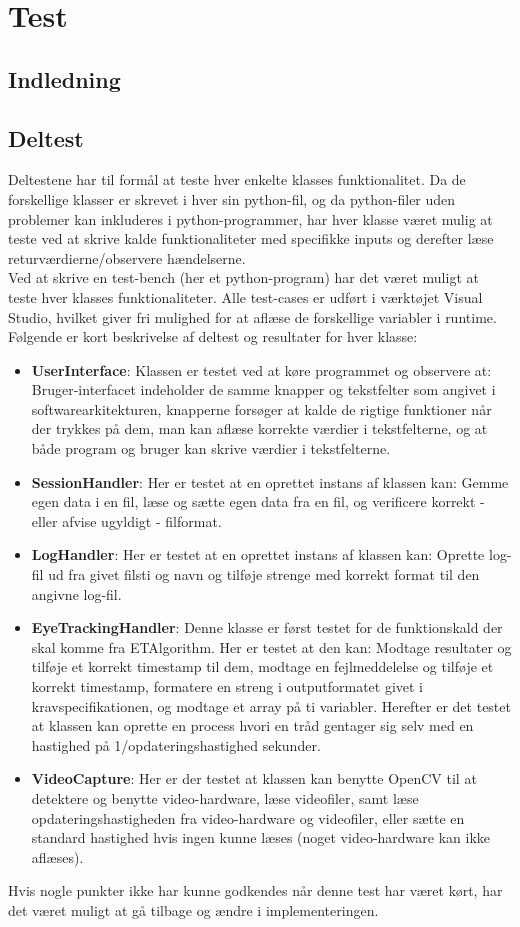 \documentclass[rapport.tex]{subfiles}
\begin{document}
\section{Test}
	\subsection{Indledning}
	\subsection{Deltest}
	Deltestene har til formål at teste hver enkelte klasses funktionalitet. 
	Da de forskellige klasser er skrevet i hver sin python-fil, og da python-filer uden problemer kan inkluderes i python-programmer, har hver klasse været mulig at teste ved at skrive kalde funktionaliteter med specifikke inputs og derefter læse returværdierne/observere hændelserne. \\
	
	Ved at skrive en test-bench (her et python-program) har det været muligt at teste hver klasses funktionaliteter. Alle test-cases er udført i værktøjet Visual Studio, hvilket giver fri mulighed for at aflæse de forskellige variabler i runtime. Følgende er kort beskrivelse af deltest og resultater for hver klasse:
	\begin{itemize}
		\item \textbf{UserInterface}: Klassen er testet ved at køre programmet og observere at: Bruger-interfacet indeholder de samme knapper og tekstfelter som angivet i softwarearkitekturen, knapperne forsøger at kalde de rigtige funktioner når der trykkes på dem, man kan aflæse korrekte værdier i tekstfelterne, og at både program og bruger kan skrive værdier i tekstfelterne. 
		\item \textbf{SessionHandler}: Her er testet at en oprettet instans af klassen kan: Gemme egen data i en fil, læse og sætte egen data fra en fil, og verificere korrekt - eller afvise ugyldigt - filformat.
		\item \textbf{LogHandler}: Her er testet at en oprettet instans af klassen kan: Oprette log-fil ud fra givet filsti og navn og tilføje strenge med korrekt format til den angivne log-fil.
		\item \textbf{EyeTrackingHandler}: Denne klasse er først testet for de funktionskald der skal komme fra ETAlgorithm. Her er testet at den kan: Modtage resultater og tilføje et korrekt timestamp til dem, modtage en fejlmeddelelse og tilføje et korrekt timestamp, formatere en streng i outputformatet givet i kravspecifikationen, og modtage et array på ti variabler. Herefter er det testet at klassen kan oprette en process hvori en tråd gentager sig selv med en hastighed på 1/opdateringshastighed sekunder.
		\item \textbf{VideoCapture}: Her er der testet at klassen kan benytte OpenCV til at detektere og benytte video-hardware, læse videofiler, samt læse opdateringshastigheden fra video-hardware og videofiler, eller sætte en standard hastighed hvis ingen kunne læses (noget video-hardware kan ikke aflæses). \\
	\end{itemize}
	Hvis nogle punkter ikke har kunne godkendes når denne test har været kørt, har det været muligt at gå tilbage og ændre i implementeringen.
\end{document}
